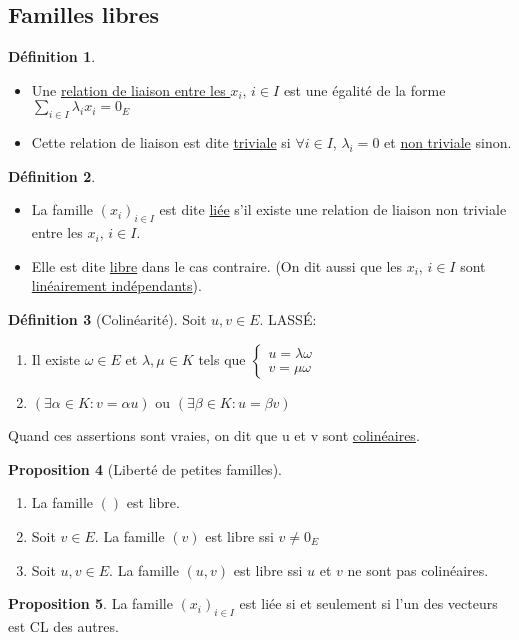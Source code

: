 \documentclass[10pt,a4paper]{article}
\theoremstyle{definition}
\newtheorem{proposition}{Proposition}[section]
\newtheorem{definition}[proposition]{Définition}
\begin{document}
\subsection{Familles libres}
\begin{definition}
\hfill
\begin{itemize}
\item Une \uline{relation de liaison entre les $x_i,\, i\in I$} est une égalité de la forme $\sum\limits_{i \in I} \lambda_i x_i = 0_E$
\item Cette relation de liaison est dite \uline{triviale} si $\forall i \in I$, $\lambda_i = 0$ et \uline{non triviale} sinon.
\end{itemize}
\end{definition}
\begin{definition}
\hfill
\begin{itemize}
\item La famille $(x_i)_{i \in I}$ est dite \uline{liée} s'il existe une relation de liaison non triviale entre les $x_i,\, i \in I$.
\item Elle est dite \uline{libre} dans le cas contraire. (On dit aussi que les $x_i,\, i \in I$ sont \uline{linéairement indépendants}).
\end{itemize}
\end{definition}

\pagebreak

\begin{definition}[Colinéarité]
Soit $u,v \in E$. LASSÉ:
\begin{enumerate}
\item Il existe $\omega \in E$ et $\lambda, \mu \in K$ tels que $\begin{cases}
u = \lambda \omega \\
v = \mu \omega
\end{cases}$
\item $(\exists \alpha \in K : v = \alpha u)$ ou $(\exists \beta \in K : u = \beta v)$
\end{enumerate}
Quand ces assertions sont vraies, on dit que u et v sont \uline{colinéaires}.
\end{definition}
\begin{proposition}[Liberté de petites familles]
\hfill
\begin{enumerate}
\item[0.] La famille $()$ est libre.
\item[1.] Soit $v \in E$. La famille $(v)$ est libre ssi $v \neq 0_E$
\item[2.] Soit $u,v \in E$. La famille $(u, v)$ est libre ssi $u$ et $v$ ne sont pas colinéaires.
\end{enumerate}
\end{proposition}
\begin{proposition}
La famille $(x_i)_{i \in I}$ est liée si et seulement si l'un des vecteurs est CL des autres.
\end{proposition}
\end{document}
